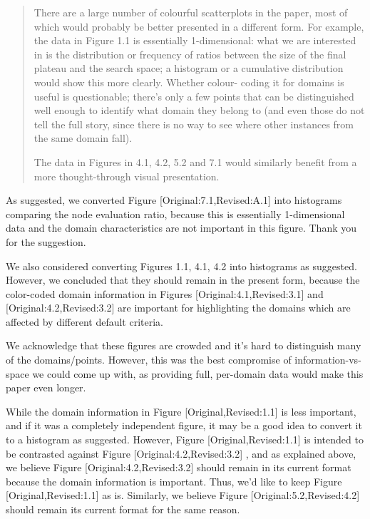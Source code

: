 \documentclass{article}
\begin{document}
\begin{quote}
 There are a large number of colourful scatterplots in the paper, most
of which would probably be better presented in a different form. For
example, the data in Figure 1.1 is essentially 1-dimensional: what we
are interested in is the distribution or frequency of ratios between
the size of the final plateau and the search space; a histogram or a
cumulative distribution would show this more clearly. Whether colour-
coding it for domains is useful is questionable; there's only a few
points that can be distinguished well enough to identify what domain
they belong to (and even those do not tell the full story, since there
is no way to see where other instances from the same domain fall).

The data in Figures in 4.1, 4.2, 5.2 and 7.1 would similarly benefit
from a more thought-through visual presentation.
\end{quote}

As suggested, we converted Figure [Original:7.1,Revised:A.1] into histograms
comparing the node evaluation ratio, because this is essentially 1-dimensional data and the domain characteristics are not important
in this figure. Thank you for the suggestion.

We also considered converting Figures 1.1, 4.1, 4.2 into histograms as suggested.
However, we concluded that they should remain in the present form, because
the color-coded domain information in Figures [Original:4.1,Revised:3.1] and [Original:4.2,Revised:3.2] are 
important for highlighting the domains which are affected by different default criteria.

We acknowledge that these figures are crowded and it's hard to distinguish
many of the domains/points. However, this was the best compromise of
information-vs-space we could come up with, as providing full,
per-domain data would make this paper even longer.

While the domain information in Figure [Original,Revised:1.1] is less
important, and if it was a completely independent figure, it may be a good idea to convert it to a histogram as suggested.
However, Figure [Original,Revised:1.1] is intended to be contrasted against 
Figure [Original:4.2,Revised:3.2] , and as
explained above, we believe Figure [Original:4.2,Revised:3.2] should
remain in its current format because the domain information is important. 
Thus, we'd like to keep Figure [Original,Revised:1.1] as is.
Similarly, we believe Figure [Original:5.2,Revised:4.2] should remain its current format for the same reason.
\end{document}
